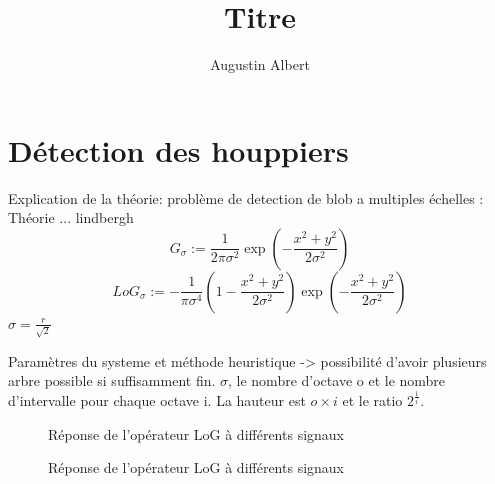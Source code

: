 \documentclass{beamer}
\title{Titre}
\author{Augustin Albert}
\begin{document}
\begin{frame}
	\titlepage
\end{frame}
\begin{frame}
	\tableofcontents
\end{frame}

\section{Détection des houppiers}

\begin{frame}
	Explication de la théorie: problème de detection de blob a multiples échelles : Théorie ... lindbergh
	\[G_{\sigma}:=\frac{1}{2\pi\sigma^{2}}\exp(-\frac{x^{2}+y^{2}}{2\sigma^{2}})\]
	\[{LoG}_{\sigma}:=-\frac{1}{\pi\sigma^{4}}(1-\frac{x^{2}+y^{2}}{2\sigma^{2}})\exp(-\frac{x^{2}+y^{2}}{2\sigma^{2}})\] 
	$\sigma=\frac{r}{\sqrt{2}}$
\end{frame}

\begin{frame}
	Paramètres du systeme et méthode heuristique -> possibilité d'avoir plusieurs arbre possible si suffisamment fin.
	$\sigma$, le nombre d'octave o et le nombre d'intervalle pour chaque octave i. La hauteur est $o \times i$ et le ratio $2^{\frac{1}{i}}$. 
\end{frame}

\begin{frame}
	\begin{figure}
		\subfloat[Réponse à un créneau pour $\sigma=1$, $\sigma=2$ et $\sigma=3$ \label{fig:b}]{\scalebox{0.3}{}}
		\caption{Réponse de l'opérateur LoG à différents signaux}
	\end{figure}
\end{frame}
\begin{frame}
	\begin{figure}
		\subfloat[Réponses à des créneaux pour $\sigma=1$\label{fig:c}]{\scalebox{0.3}{}}
		\caption{Réponse de l'opérateur LoG à différents signaux}
	\end{figure}
\end{frame}
\end{document}
